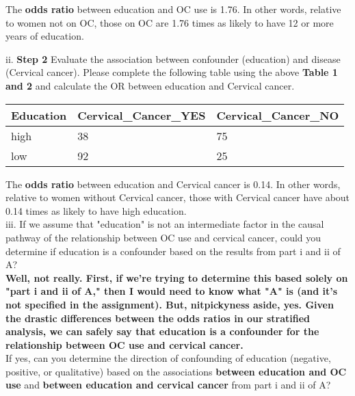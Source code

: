 \documentclass[12pt]{article}
\begin{document}
The \textbf{odds ratio} between education and OC use is 1.76.  In other words, relative to women not on OC, those on OC are 1.76 times as likely to have 12 or more years of education.
\newpage

ii. \textbf{Step 2} Evaluate the association between confounder (education) and disease (Cervical cancer).  Please complete the following table using the above \textbf{Table 1 and 2} and calculate the OR between education and Cervical cancer.


\begin{table}[H]
\caption*{Table 1 and 2: OR between education and Cervical cancer}
\begin{table}[ht]
\centering
\begin{tabular}{lll}
  \hline
Education & Cervical\_Cancer\_YES & Cervical\_Cancer\_NO \\ 
  \hline
high & 38 & 75 \\ 
  low & 92 & 25 \\ 
   \hline
\end{tabular}
\end{table}\end{table}

The \textbf{odds ratio} between education and Cervical cancer is 0.14.  In other words, relative to women without Cervical cancer, those with Cervical cancer have about 0.14 times as likely to have high education. \\

iii. If we assume that "education" is not an intermediate factor in the causal pathway of the relationship between OC use and cervical cancer, could you determine if education is a confounder based on the results from part i and ii of A?  \\

\textbf{Well, not really.  First, if we're trying to determine this based solely on "part i and ii of A," then I would need to know what "A" is (and it's not specified in the assignment). But, nitpickyness aside, yes. Given the drastic differences between the odds ratios in our stratified analysis, we can safely say that education is a confounder for the relationship between OC use and cervical cancer.} \\

If yes, can you determine the direction of confounding of education (negative, positive, or qualitative) based on the associations \textbf{between education and OC use} and \textbf{between education and cervical cancer} from part i and ii of A? \\
\end{document}
